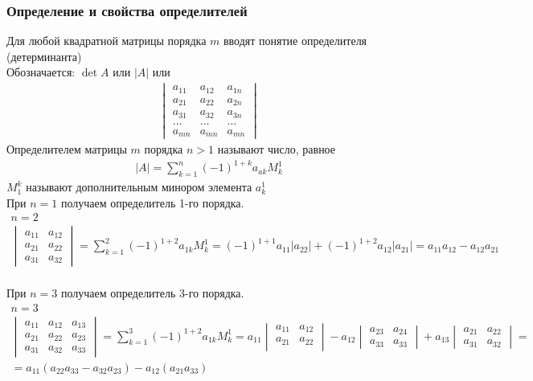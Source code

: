 \documentclass[a4paper, 11pt, oneside]{article}
\begin{document}
\subsubsection{Определение и свойства определителей}
Для любой квадратной матрицы порядка $m$ вводят понятие определителя (детерминанта)\\
Обозначается: $\det A$ или $|A|$ или
\begin{gather*}
	\begin{vmatrix}
		a_{11}& a_{12}& a_{1n}\\
		a_{21}& a_{22}& a_{2n}\\
		a_{31}& a_{32}& a_{3n}\\
		\dots & \dots & \dots\\
		a_{mn}& a_{mn}& a_{mn}
	\end{vmatrix}
\end{gather*}
Определителем матрицы $m$ порядка $n>1$ называют число, равное
\begin{gather*}
	|A| = \sum_{k=1}^n (-1)^{1+k} a_{ak}M^1_k
\end{gather*}
$M_1^k$ называют дополнительным минором элемента $a_k^1$\\
При $n=1$ получаем определитель 1-го порядка. 
\begin{gather*}
	n=2\\
	\begin{vmatrix}
		a_{11}& a_{12}\\
		a_{21}& a_{22}\\
		a_{31}& a_{32}
	\end{vmatrix}
	=
	\sum_{k=1}^2 (-1)^{1+2} a_{1k}M^1_k = (-1)^{1+1} a_{11} |a_{22}| + (-1)^{1+2}a_{12} |a_{21}|=a_{11}a_{12}-a_{12}a_{21}
\end{gather*}\\
При $n=3$ получаем определитель 3-го порядка. 
\begin{gather*}
	n=3\\
	\begin{vmatrix}
		a_{11}& a_{12}& a_{13}\\
		a_{21}& a_{22}& a_{23}\\
		a_{31}& a_{32}& a_{33}
	\end{vmatrix}
	=
	\sum_{k=1}^3 (-1)^{1+2} a_{1k}M^1_k=
	a_{11}
	\begin{vmatrix}
		a_{11}& a_{12}\\
		a_{21}& a_{22}\\
	\end{vmatrix}
	-
	a_{12}
	\begin{vmatrix}
		a_{23}& a_{24}\\
		a_{33}& a_{33}
	\end{vmatrix}
	+
	a_{13}
	\begin{vmatrix}
		a_{21}& a_{22}\\
		a_{31}& a_{32}
	\end{vmatrix}
	=\\=
	a_{11}(a_{22}a_{33} - a_{32}a_{23}) - a_{12}(a_{21}a_{33})%
\end{gather*}\\
\end{document}
